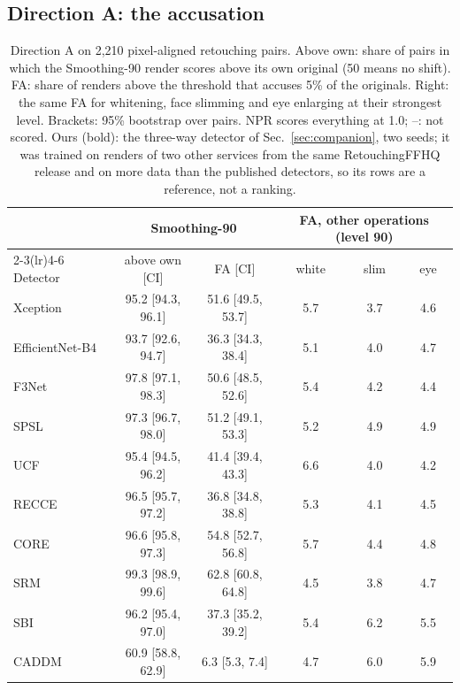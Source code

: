\documentclass[journal]{IEEEtran}  %
\begin{document}
\subsection{Direction A: the accusation}
\label{sec:accuse}
\begin{table}[t]
\centering
\caption{Direction A on 2,210 pixel-aligned retouching pairs. Above own: share of pairs in which the Smoothing-90 render
scores above its own original (50 means no shift). FA: share of renders above the threshold that accuses 5\% of the
originals. Right: the same FA for whitening, face slimming and eye enlarging at their strongest level. Brackets: 95\%
bootstrap over pairs. NPR scores everything at 1.0; --: not scored. Ours (bold): the three-way detector of Sec.~\ref{sec:companion}, two seeds; it was trained on renders of two other services from the same RetouchingFFHQ release and on more data than the published detectors, so its rows are a reference, not a ranking.}
\label{tab:dirA}
\scriptsize
\setlength{\tabcolsep}{2.5pt}
\begin{tabular}{@{}l cc ccc@{}}
\toprule
 & \multicolumn{2}{c}{Smoothing-90} & \multicolumn{3}{c}{FA, other operations (level 90)} \\
\cmidrule(lr){2-3}\cmidrule(lr){4-6}
Detector & above own [CI] & FA [CI] & white & slim & eye \\
\midrule
Xception & 95.2 [94.3, 96.1] & 51.6 [49.5, 53.7] & 5.7 & 3.7 & 4.6 \\
EfficientNet-B4 & 93.7 [92.6, 94.7] & 36.3 [34.3, 38.4] & 5.1 & 4.0 & 4.7 \\
F3Net & 97.8 [97.1, 98.3] & 50.6 [48.5, 52.6] & 5.4 & 4.2 & 4.4 \\
SPSL & 97.3 [96.7, 98.0] & 51.2 [49.1, 53.3] & 5.2 & 4.9 & 4.9 \\
UCF & 95.4 [94.5, 96.2] & 41.4 [39.4, 43.3] & 6.6 & 4.0 & 4.2 \\
RECCE & 96.5 [95.7, 97.2] & 36.8 [34.8, 38.8] & 5.3 & 4.1 & 4.5 \\
CORE & 96.6 [95.8, 97.3] & 54.8 [52.7, 56.8] & 5.7 & 4.4 & 4.8 \\
SRM & 99.3 [98.9, 99.6] & 62.8 [60.8, 64.8] & 4.5 & 3.8 & 4.7 \\
SBI & 96.2 [95.4, 97.0] & 37.3 [35.2, 39.2] & 5.4 & 6.2 & 5.5 \\
CADDM & 60.9 [58.8, 62.9] & 6.3 [5.3, 7.4] & 4.7 & 6.0 & 5.9 \\

\end{tabular}
\end{table}
\end{document}
